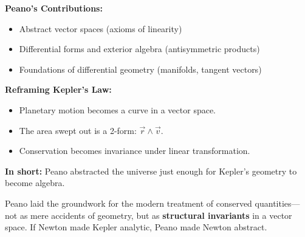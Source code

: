 \begin{tcolorbox}[colback=gray!5!white, colframe=black, title=\textbf{Sidebar: From Peano to Kepler — Sweeping in Vector Space}, fonttitle=\bfseries, arc=1.5mm, boxrule=0.4pt]

\textbf{Peano’s Contributions:}
\begin{itemize}
  \item Abstract vector spaces (axioms of linearity)
  \item Differential forms and exterior algebra (antisymmetric products)
  \item Foundations of differential geometry (manifolds, tangent vectors)
\end{itemize}

\textbf{Reframing Kepler’s Law:}
\begin{itemize}
  \item Planetary motion becomes a curve in a vector space.
  \item The area swept out is a 2-form: \( \vec{r} \wedge \vec{v} \).
  \item Conservation becomes invariance under linear transformation.
\end{itemize}

\textbf{In short:} Peano abstracted the universe just enough for Kepler’s geometry to become algebra.

\end{tcolorbox}

\bigskip

Peano laid the groundwork for the modern treatment of conserved quantities—not as mere accidents of geometry, but as \textbf{structural invariants} in a vector space. If Newton made Kepler analytic, Peano made Newton abstract.
